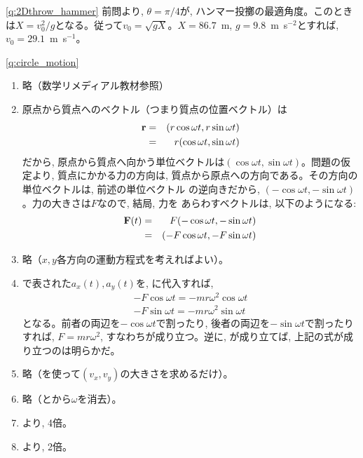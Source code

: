 \ref{q:2Dthrow_hammer}
前問より, $\theta=\pi/4$が, ハンマー投擲の最適角度。このとき
は$X=v_0^2/g$となる。従って$v_0=\sqrt{gX}$。$X=86.7$~m, 
$g=9.8$~m~s$^{-2}$とすれば, $v_0=29.1$~m~s$^{-1}$。
\mv

\ref{q:circle_motion}
\begin{enumerate}
\item 略（数学リメディアル教材参照）
\item 原点から質点へのベクトル（つまり質点の位置ベクトル）は
\begin{eqnarray}
{\bf r}&=&(r\cos\omega t, r\sin\omega t)\nonumber\\
       &=&r(\cos\omega t, \sin\omega t)
\end{eqnarray}
だから, 原点から質点へ向かう単位ベクトルは$(\cos\omega t, \sin\omega t)$。問題の仮定より, 
質点にかかる力の方向は, 質点から原点への方向である。その方向の単位ベクトルは, 前述の単位ベクトル
の逆向きだから, $(-\cos\omega t, -\sin\omega t)$。力の大きさは$F$なので, 結局, 力を
あらわすベクトルは, 以下のようになる:
\begin{eqnarray}
{\bf F}(t)&=&F(-\cos\omega t, -\sin\omega t)\nonumber\\
          &=&(-F\cos\omega t, -F\sin\omega t)
\end{eqnarray}
\item 略（$x, y$各方向の運動方程式を考えればよい）。
\item {}で表された$a_x(t), a_y(t)$を, に代入すれば, 
\begin{eqnarray}
-F\cos\omega t=-mr\omega^2\cos\omega t\\
-F\sin\omega t=-mr\omega^2\sin\omega t
\end{eqnarray}
となる。前者の両辺を$-\cos\omega t$で割ったり, 後者の両辺を$-\sin\omega t$で割ったり
すれば, $F=mr\omega^2$, すなわちが成り立つ。逆に, 
が成り立てば, 上記の式が成り立つのは明らかだ。
\item 略（を使って$(v_x, v_y)$の大きさを求めるだけ）。
\item 略（とから$\omega$を消去）。
\item {}より, 4倍。
\item {}より, 2倍。
\end{enumerate}
\mv

